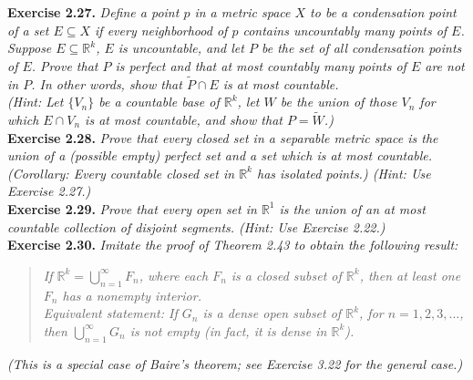 \documentclass{article}
\begin{document}



\textbf{Exercise 2.27.}
\emph{
Define a point $p$ in a metric space $X$ to be a {\it condensation
point} of a set $E \subseteq X$ if every neighborhood of $p$ contains
uncountably many points of $E$.} \\

\emph{Suppose $E \subseteq \mathbb{R}^k$, $E$ is uncountable,
and let $P$ be the set of all condensation points of $E$.
Prove that $P$ is perfect and that at most countably many points of $E$ are not in $P$.
In other words, show that $\widetilde{P} \cap E$ is at most countable.} \\

\emph{(Hint: Let $\{V_n\}$ be a countable base of $\mathbb{R}^k$,
let $W$ be the union of those $V_n$ for which $E \cap V_n$ is at most countable,
and show that $P = \widetilde{W}$.)} \\






\textbf{Exercise 2.28.}
\emph{Prove that every closed set in a separable metric space is
the union of a (possible empty) perfect set and a set which is at most
countable.
(Corollary: Every countable closed set in $\mathbb{R}^k$ has isolated points.)
(Hint: Use Exercise 2.27.) } \\






\textbf{Exercise 2.29.}
\emph{Prove that every open set in $\mathbb{R}^1$ is the union of
an at most countable collection of disjoint segments.
(Hint: Use Exercise 2.22.)} \\






\textbf{Exercise 2.30.}
\emph{Imitate the proof of Theorem 2.43 to obtain the following result:}
\begin{quote}
\emph{If $\mathbb{R}^k = \bigcup_{n=1}^{\infty} F_n$,
where each $F_n$ is a closed subset of $\mathbb{R}^k$,
then at least one $F_n$ has a nonempty interior.} \\

\emph{Equivalent statement: If $G_n$ is a dense open subset of $\mathbb{R}^k$,
for $n = 1,2,3,\ldots$, then $\bigcup_{n=1}^{\infty} G_n$ is not empty
(in fact, it is dense in $\mathbb{R}^k$).}
\end{quote}
\emph{(This is a special case of Baire's theorem; see Exercise 3.22 for the general case.)} \\



\end{document}
